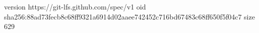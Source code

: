 version https://git-lfs.github.com/spec/v1
oid sha256:88ad73fecb8c68ff9321a6914d02aaee742452c716bd67483c68ff650f5f04c7
size 629
